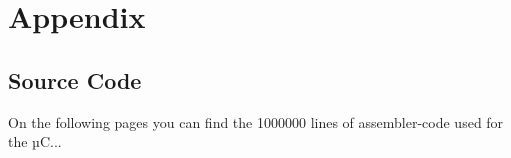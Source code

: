 \chapter{Appendix}
%
%
\section{Source Code}
On the following pages you can find the 1000000 lines of assembler-code used for the µC...
%
%



